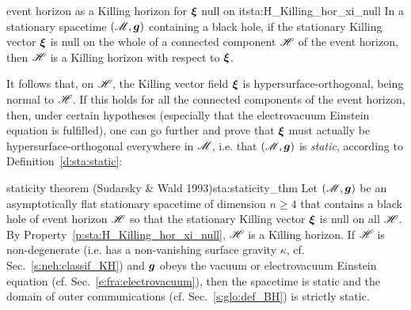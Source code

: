 \begin{tprop}{event horizon as a Killing horizon for $\bm{\xi}$ null on it}{sta:H_Killing_hor_xi_null}
In a stationary spacetime $(\mathscr{M},\bm{g})$ containing a black hole,
if the stationary Killing vector $\bm{\xi}$
is null on the whole of a connected component $\mathscr{H}$ of the event horizon, then $\mathscr{H}$ is a Killing horizon with respect to $\bm{\xi}$.
\end{tprop}

It follows that, on $\mathscr{H}$, the Killing vector field $\bm{\xi}$
is hypersurface-orthogonal, being normal to $\mathscr{H}$.
If this holds for all the connected components of the event horizon, then,
under certain hypotheses (especially
that the electrovacuum Einstein equation is fulfilled), one can go further
and prove that $\bm{\xi}$ must actually be hypersurface-orthogonal everywhere in $\mathscr{M}$,
i.e. that $(\mathscr{M},\bm{g})$ is \emph{static}, according to Definition~\ref{d:sta:static}:

\begin{tprop}{staticity theorem \textnormal{(Sudarsky \& Wald 1993)}}{sta:staticity_thm}
Let $(\mathscr{M},\bm{g})$ be an asymptotically flat stationary spacetime of dimension $n\geq 4$
that contains a black hole of event horizon $\mathscr{H}$ so that
the stationary Killing vector $\bm{\xi}$ is null on all $\mathscr{H}$. By Property~\ref{p:sta:H_Killing_hor_xi_null}, $\mathscr{H}$ is a Killing horizon. If $\mathscr{H}$ is
non-degenerate (i.e. has a non-vanishing surface gravity $\kappa$, cf. Sec.~\ref{s:neh:classif_KH})
and $\bm{g}$ obeys the vacuum or electrovacuum Einstein equation (cf. Sec.~\ref{e:fra:electrovacuum}),
then the spacetime
is static and the domain of outer communications (cf. Sec.~\ref{s:glo:def_BH}) is strictly static.
\end{tprop}

